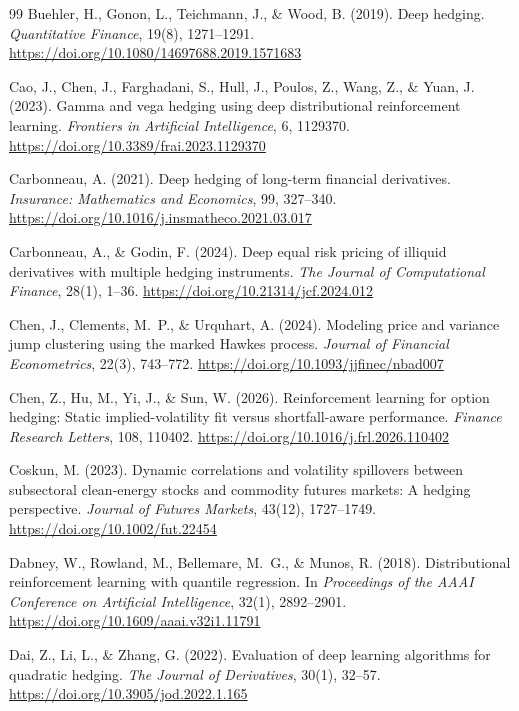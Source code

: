 \documentclass[11pt,a4paper]{article}
\begin{document}
\begin{thebibliography}{99}
Buehler, H., Gonon, L., Teichmann, J., \& Wood, B. (2019).
Deep hedging.
\emph{Quantitative Finance}, 19(8), 1271--1291.
\url{https://doi.org/10.1080/14697688.2019.1571683}

Cao, J., Chen, J., Farghadani, S., Hull, J., Poulos, Z., Wang, Z., \& Yuan, J. (2023).
Gamma and vega hedging using deep distributional reinforcement learning.
\emph{Frontiers in Artificial Intelligence}, 6, 1129370.
\url{https://doi.org/10.3389/frai.2023.1129370}

Carbonneau, A. (2021).
Deep hedging of long-term financial derivatives.
\emph{Insurance: Mathematics and Economics}, 99, 327--340.
\url{https://doi.org/10.1016/j.insmatheco.2021.03.017}

Carbonneau, A., \& Godin, F. (2024).
Deep equal risk pricing of illiquid derivatives with multiple hedging instruments.
\emph{The Journal of Computational Finance}, 28(1), 1--36.
\url{https://doi.org/10.21314/jcf.2024.012}

Chen, J., Clements, M.~P., \& Urquhart, A. (2024).
Modeling price and variance jump clustering using the marked Hawkes process.
\emph{Journal of Financial Econometrics}, 22(3), 743--772.
\url{https://doi.org/10.1093/jjfinec/nbad007}

Chen, Z., Hu, M., Yi, J., \& Sun, W. (2026).
Reinforcement learning for option hedging: Static implied-volatility fit versus shortfall-aware performance.
\emph{Finance Research Letters}, 108, 110402.
\url{https://doi.org/10.1016/j.frl.2026.110402}

Coskun, M. (2023).
Dynamic correlations and volatility spillovers between subsectoral clean-energy stocks and commodity futures markets: A hedging perspective.
\emph{Journal of Futures Markets}, 43(12), 1727--1749.
\url{https://doi.org/10.1002/fut.22454}

Dabney, W., Rowland, M., Bellemare, M.~G., \& Munos, R. (2018).
Distributional reinforcement learning with quantile regression.
In \emph{Proceedings of the AAAI Conference on Artificial Intelligence}, 32(1), 2892--2901.
\url{https://doi.org/10.1609/aaai.v32i1.11791}

Dai, Z., Li, L., \& Zhang, G. (2022).
Evaluation of deep learning algorithms for quadratic hedging.
\emph{The Journal of Derivatives}, 30(1), 32--57.
\url{https://doi.org/10.3905/jod.2022.1.165}


\end{thebibliography}
\end{document}
